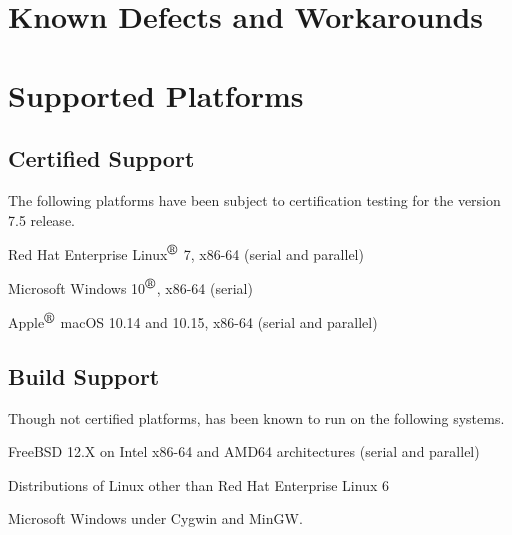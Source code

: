 \documentclass[letterpaper]{scrartcl}
\begin{document}
\newpage
\section{Known Defects and Workarounds}


\newpage
\section{Supported Platforms}
\subsection*{Certified Support}
The following platforms have been subject to certification testing for the
\Xyce{} version 7.5 release.
\begin{XyceItemize}
  \item Red Hat Enterprise Linux${}^{\mbox{\textregistered}}$ 7, x86-64 (serial and parallel)
  \item Microsoft Windows 10${}^{\mbox{\textregistered}}$, x86-64 (serial)
  \item Apple${}^{\mbox{\textregistered}}$ macOS 10.14 and 10.15, x86-64 (serial and parallel)
\end{XyceItemize}


\subsection*{Build Support}
Though not certified platforms, \Xyce{} has been known to run on the following
systems.
\begin{XyceItemize}
  \item FreeBSD 12.X on Intel x86-64 and AMD64 architectures (serial
    and parallel)
  \item Distributions of Linux other than Red Hat Enterprise Linux 6
  \item Microsoft Windows under Cygwin and MinGW.
\end{XyceItemize}
\end{document}
